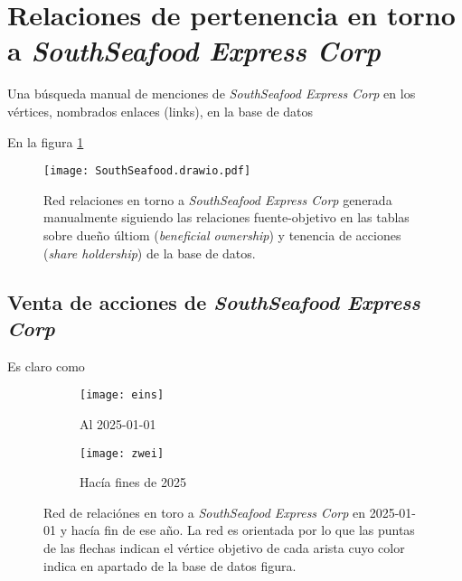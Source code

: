 \documentclass[11pt,spanish,a4paper]{article}
\begin{document}
\section{Relaciones de pertenencia en torno a \emph{SouthSeafood Express Corp}}

Una búsqueda manual de menciones de \emph{SouthSeafood Express Corp} en los vértices, nombrados enlaces (links), en la base de datos


En la figura \ref{fig:drawio} 

\begin{figure}[!ht]
	\centering
	\texttt{[image: SouthSeafood.drawio.pdf]}
	\caption{Red relaciones en torno a \emph{SouthSeafood Express Corp} generada manualmente siguiendo las relaciones fuente-objetivo en las tablas sobre dueño últiom (\emph{beneficial ownership}) y tenencia de acciones (\emph{share holdership}) de la base de datos.}
	\label{fig:drawio}
\end{figure}



\subsection{Venta de acciones de \emph{SouthSeafood Express Corp}}

Es claro como 

\begin{figure}[!ht]
	\centering
	\begin{subfigure}[b]{\textwidth}
		\centering
		\texttt{[image: eins]}
		\caption{Al 2025-01-01}
		\label{fig:antes}
	\end{subfigure}
	\begin{subfigure}[b]{\textwidth}
		\centering
		\texttt{[image: zwei]}
		\caption{Hacía fines de 2025}
		\label{fig:después}
	\end{subfigure}
	\caption{
		Red de relaciónes en toro a \emph{SouthSeafood Express Corp} en 2025-01-01 y hacía fin de ese año.
		La red es orientada por lo que las puntas de las flechas indican el vértice objetivo de cada arista cuyo color indica en apartado de la base de datos figura.
		}
	\label{fig:Networkx}
\end{figure}


\printbibliography[heading=bibintoc] %
\end{document}
